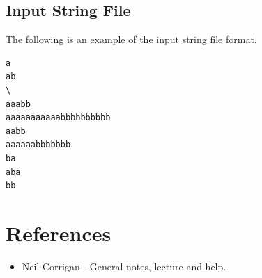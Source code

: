 \documentclass{report}
\begin{document}
\section{Input String File} 

The following is an example of the input string file format.
\begin{verbatim}
a
ab
\
aaabb
aaaaaaaaaaabbbbbbbbbb
aabb
aaaaaabbbbbbb
ba
aba
bb
\end{verbatim}
   
  

\chapter{References}

\begin{itemize}
\item Neil Corrigan - General notes, lecture and help.
\end{itemize}

 

 
\end{document}
